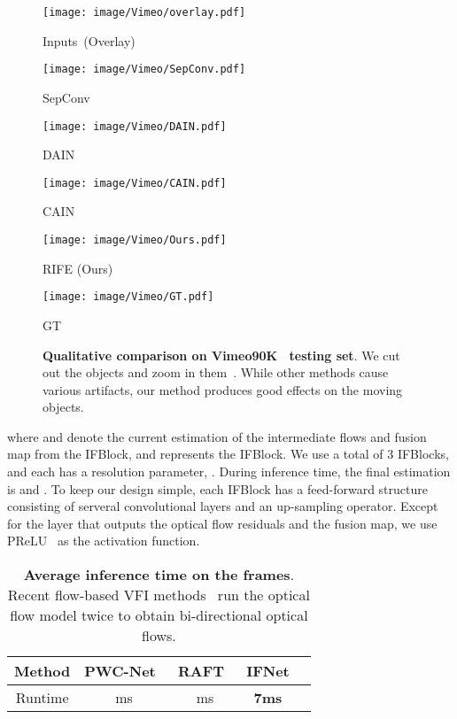 \documentclass[final]{cvpr}
\def\red#1{\textcolor{MyRed}{#1}}
\def\first#1{\red{\textbf{#1}}}
\begin{document}
\begin{figure*}[htbp]
  \centering
  \begin{minipage}[t]{0.162\linewidth}
  \centering
  \texttt{[image: image/Vimeo/overlay.pdf]}
  \centerline{Inputs~(Overlay)}
  \end{minipage}
  \begin{minipage}[t]{0.162\linewidth}
  \centering
  \texttt{[image: image/Vimeo/SepConv.pdf]}
  \centerline{SepConv~\cite{niklaus2017video}}
  \end{minipage}
\begin{minipage}[t]{0.162\linewidth}
  \centering
  \texttt{[image: image/Vimeo/DAIN.pdf]}
  \centerline{DAIN~\cite{bao2019depth}}
  \end{minipage}
  \begin{minipage}[t]{0.162\linewidth}
  \centering
  \texttt{[image: image/Vimeo/CAIN.pdf]}
  \centerline{CAIN~\cite{choi2020channel}}
  \end{minipage}
  \begin{minipage}[t]{0.163\textwidth}
  \centering
  \texttt{[image: image/Vimeo/Ours.pdf]}
  \centerline{RIFE (Ours)}
  \end{minipage}
  \begin{minipage}[t]{0.1635\textwidth}
  \centering
  \texttt{[image: image/Vimeo/GT.pdf]}
  \centerline{GT}
  \end{minipage}
  \caption{\textbf{Qualitative comparison on Vimeo90K~\cite{xue2019video} testing set}. We cut out the objects and zoom in them~\cite{choi2020channel}. While other methods cause various artifacts, our method produces good effects on the moving objects.}
\label{fig:Vimeo}
\end{figure*} 

where  and  denote the current estimation of the intermediate flows and fusion map from the  IFBlock, and  represents the  IFBlock. We use a total of 3 IFBlocks, and each has a resolution parameter, . During inference time, the final estimation is  and . To keep our design simple, each IFBlock has a feed-forward structure consisting of serveral convolutional layers and an up-sampling operator. Except for the layer that outputs the optical flow residuals and the fusion map, we use PReLU~\cite{he2015delving} as the activation function.

\begin{table}[t]
	\centering
	\begin{tabular}{ccccc}
		\hline
		Method&PWC-Net~\cite{sun2018pwc}&RAFT~\cite{teed2020raft}&IFNet\\ \hline
		Runtime & ms & ms& \first{7ms} \\ \hline
	\end{tabular}
	\caption{\textbf{Average inference time on the  frames}. Recent flow-based VFI methods~\cite{jiang2018super, bao2019depth, niklaus2020softmax} run the optical flow model twice to obtain bi-directional optical flows.}\label{tab:runtime}
\end{table}
\end{document}
